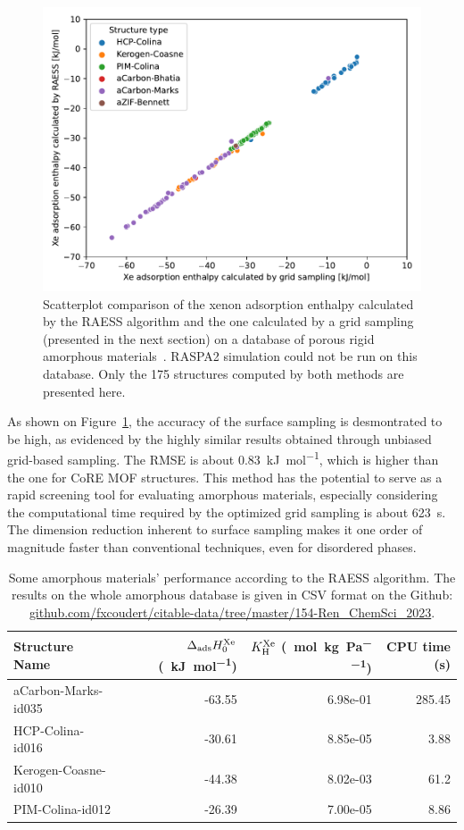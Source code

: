 \documentclass[main]{subfiles}
\begin{document}
\begin{figure}[ht]
  \centering
  \includegraphics[width=0.5\linewidth]{figures/3-fastsim/amorphous_enthalpy.pdf}
  \caption{Scatterplot comparison of the xenon adsorption enthalpy calculated by the RAESS algorithm and the one calculated by a grid sampling (presented in the next section) on a database of porous rigid amorphous materials~\autocite{Thyagarajan_2020}. RASPA2 simulation could not be run on this database. Only the 175 structures computed by both methods are presented here. }\label{fgr:amorphous}
\end{figure}

As shown on Figure~\ref{fgr:amorphous}, the accuracy of the surface sampling is desmontrated to be high, as evidenced by the highly similar results obtained through unbiased grid-based sampling. The RMSE is about \SI{0.83}{\kJ\per\mol}, which is higher than the one for CoRE MOF structures. This method has the potential to serve as a rapid screening tool for evaluating amorphous materials, especially considering the computational time required by the optimized grid sampling is about \SI{623}{\second}. The dimension reduction inherent to surface sampling makes it one order of magnitude faster than conventional techniques, even for disordered phases.

\begin{table}[hb]
  \setlength{\extrarowheight}{1pt}
  \caption{Some amorphous materials' performance according to the RAESS algorithm. The results on the whole amorphous database is given in CSV format on the Github: \url{github.com/fxcoudert/citable-data/tree/master/154-Ren_ChemSci_2023}.}\label{tab:amorphous}  \centering
  \begin{tabular}{|l|r|r|r|}
    \hline
    Structure Name & $\Delta_{\text{ads}}H_{\text{0}}^{\text{Xe}}$ (\SI{}{\kilo\joule\per\mole}) & $K_{\text{H}}^{\text{Xe}}$ (\SI{}{\mole\per\kilo\gram\per\pascal}) & CPU time (s) \\
    \hline
    aCarbon-Marks-id035 &                 -63.55 &            6.98e-01 & 285.45 \\
    HCP-Colina-id016 &                 -30.61 &            8.85e-05 & 3.88 \\
    Kerogen-Coasne-id010 &                 -44.38 &            8.02e-03 & 61.2 \\
    PIM-Colina-id012 &                 -26.39 &            7.00e-05 & 8.86 \\
    \hline
    \end{tabular}
\end{table}
\end{document}
